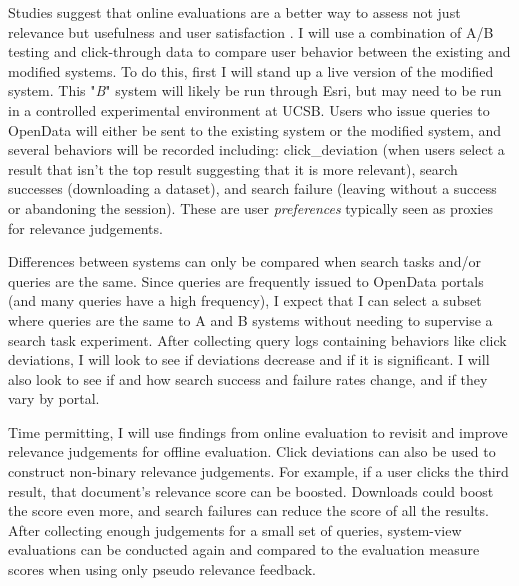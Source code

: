 Studies suggest that online evaluations are a better way to assess not just relevance but usefulness and user satisfaction \cite{Hofmann2016} \cite{Zhang2018} \cite{Chen2017}. I will use a combination of A/B testing and click-through data to compare user behavior between the existing and modified systems. To do this, first I will stand up a live version of the modified system. This "\emph{B}" system will likely be run through Esri, but may need to be run in a controlled experimental environment at UCSB. Users who issue queries to OpenData will either be sent to the existing system or the modified system, and several behaviors will be recorded including: \gls{click_deviation} (when users select a result that isn't the top result suggesting that it is more relevant), search successes (downloading a dataset), and search failure (leaving without a success or abandoning the session). These are user \emph{preferences} typically seen as proxies for relevance judgements.

Differences between systems can only be compared when search tasks and/or queries are the same. Since queries are frequently issued to OpenData portals (and many queries have a high frequency), I expect that I can select a subset where queries are the same to A and B systems without needing to supervise a search task experiment. After collecting query logs containing behaviors like click deviations, I will look to see if deviations decrease and if it is significant. I will also look to see if and how search success and failure rates change, and if they vary by portal.

Time permitting, I will use findings from online evaluation to revisit and improve relevance judgements for offline evaluation. Click deviations can also be used to construct non-binary relevance judgements. For example, if a user clicks the third result, that document's relevance score can be boosted. Downloads could boost the score even more, and search failures can reduce the score of all the results. After collecting enough judgements for a small set of queries, system-view evaluations can be conducted again and compared to the evaluation measure scores when using only pseudo relevance feedback.


